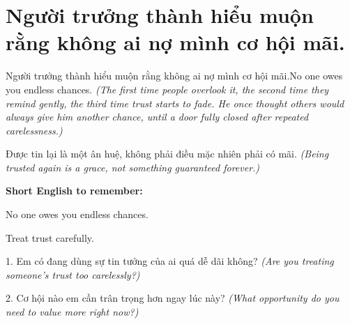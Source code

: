 \section{Người trưởng thành hiểu muộn rằng không ai nợ mình cơ hội mãi.}
\begin{truyen}{Người trưởng thành hiểu muộn rằng không ai nợ mình cơ hội mãi.}{No one owes you endless chances.}
\textit{(The first time people overlook it, the second time they remind gently, the third time trust starts to fade. He once thought others would always give him another chance, until a door fully closed after repeated carelessness.)}
\end{truyen}
\begin{baihoc}
Được tin lại là một ân huệ, không phải điều mặc nhiên phải có mãi.
\textit{(Being trusted again is a grace, not something guaranteed forever.)}
\end{baihoc}
\begin{ghinhoanh}
\textbf{Short English to remember:}

No one owes you endless chances.

Treat trust carefully.
\end{ghinhoanh}
\begin{tuhocnhanh}
1. Em có đang dùng sự tin tưởng của ai quá dễ dãi không? \textit{(Are you treating someone's trust too carelessly?)}

2. Cơ hội nào em cần trân trọng hơn ngay lúc này? \textit{(What opportunity do you need to value more right now?)}
\end{tuhocnhanh}
\ngancach